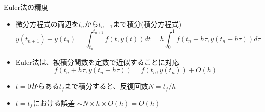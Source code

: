 \begin{frame}[t,fragile]{Euler法の精度}
  \begin{itemize}
    \setlength{\itemsep}{1em}
  \item 微分方程式の両辺を$t_n$から$t_{n+1}$まで積分(積分方程式)
    \[
    y(t_{n+1}) - y(t_n) = \int^{t_{n+1}}_{t_n} \!\! f(t, y(t)) dt = h \int^1_0 \! f(t_n+h\tau, y(t_n+h\tau)) d\tau
    \]
  \item Euler法は、被積分関数を定数で近似することに対応
    \[
    f(t_n+h\tau, y(t_n+h\tau)) = f(t_n, y(t_n)) + O(h)
    \]
  \item $t=0$からある$t_f$まで積分すると、反復回数$N = t_f / h$
  \item $t=t_f$における誤差 $\sim N \times h \times O(h) = O(h)$
  \end{itemize}
\end{frame}
